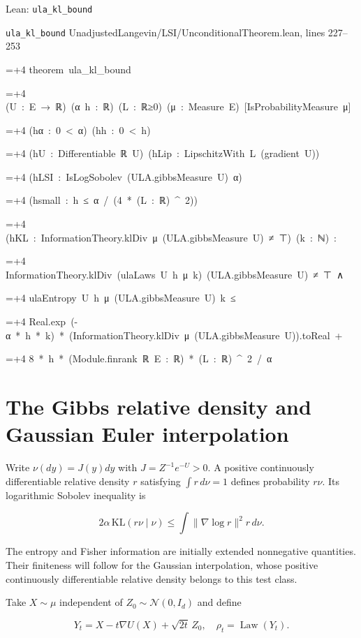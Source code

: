 \documentclass[11pt,a4paper]{article}
\newlength{\leancharwidth}
\newenvironment{leancode}{\par\smallskip\begingroup\ttfamily\footnotesize\raggedright
  \settowidth{\leancharwidth}{M}\setlength{\parskip}{0pt}\setlength{\parindent}{0pt}
  \frenchspacing}{\par\endgroup\smallskip}
\newcommand{\leanline}[2]{\hangindent=\dimexpr#1\leancharwidth+4\leancharwidth\relax
  \hangafter=1\noindent\hspace*{#1\leancharwidth}#2\par}
\newcommand{\leansource}[1]{\par{\footnotesize\color{leanmuted}#1}\par}
\begin{document}
\begin{leanbox}{Lean: \texttt{ula\_\allowbreak{}kl\_\allowbreak{}bound}}
\leansource{\texttt{ula\_\allowbreak{}kl\_\allowbreak{}bound} \quad UnadjustedLangevin/\allowbreak{}LSI/\allowbreak{}UnconditionalTheorem.lean, lines 227–253}
\begin{leancode}
\leanline{0}{theorem\ ula\_kl\_bound}
\leanline{4}{(U\ :\ E\ →\ ℝ)\ (α\ h\ :\ ℝ)\ (L\ :\ ℝ≥0)\ (μ\ :\ Measure\ E)\ [IsProbabilityMeasure\ μ]}
\leanline{4}{(hα\ :\ 0\ <\ α)\ (hh\ :\ 0\ <\ h)}
\leanline{4}{(hU\ :\ Differentiable\ ℝ\ U)\ (hLip\ :\ LipschitzWith\ L\ (gradient\ U))}
\leanline{4}{(hLSI\ :\ IsLogSobolev\ (ULA.gibbsMeasure\ U)\ α)}
\leanline{4}{(hsmall\ :\ h\ ≤\ α\ /\ (4\ *\ (L\ :\ ℝ)\ \textasciicircum{}\ 2))}
\leanline{4}{(hKL\ :\ InformationTheory.klDiv\ μ\ (ULA.gibbsMeasure\ U)\ ≠\ ⊤)\ (k\ :\ ℕ)\ :}
\leanline{4}{InformationTheory.klDiv\ (ulaLaws\ U\ h\ μ\ k)\ (ULA.gibbsMeasure\ U)\ ≠\ ⊤\ ∧}
\leanline{6}{ulaEntropy\ U\ h\ μ\ (ULA.gibbsMeasure\ U)\ k\ ≤}
\leanline{8}{Real.exp\ (-α\ *\ h\ *\ k)\ *\ (InformationTheory.klDiv\ μ\ (ULA.gibbsMeasure\ U)).toReal\ +}
\leanline{10}{8\ *\ h\ *\ (Module.finrank\ ℝ\ E\ :\ ℝ)\ *\ (L\ :\ ℝ)\ \textasciicircum{}\ 2\ /\ α}
\end{leancode}
\end{leanbox}

\section{\texorpdfstring{The Gibbs relative density and Gaussian Euler interpolation}{The Gibbs relative density and Gaussian Euler interpolation}}


Write \(\nu(dy)=J(y)dy\) with \(J=Z^{-1}e^{-U}>0\). A positive continuously differentiable relative density \(r\) satisfying \(\int r\,d\nu=1\) defines probability \(r\nu\). Its logarithmic Sobolev inequality is

\[2\alpha\,\mathrm{KL}(r\nu\mid\nu)\le\int\|\nabla\log r\|^2r\,d\nu.\]

The entropy and Fisher information are initially extended nonnegative quantities. Their finiteness will follow for the Gaussian interpolation, whose positive continuously differentiable relative density belongs to this test class.



Take \(X\sim\mu\) independent of \(Z_0\sim\mathcal N(0,I_d)\) and define

\[Y_t=X-t\nabla U(X)+\sqrt{2t}\,Z_0,\quad\rho_t=\operatorname{Law}(Y_t).\]
\end{document}
